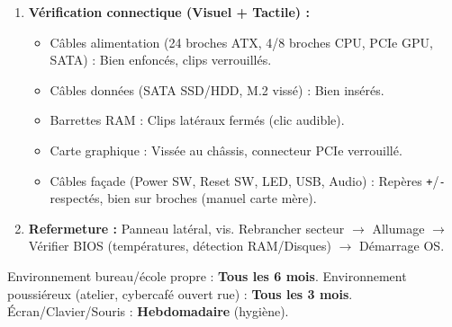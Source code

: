 \documentclass[11pt]{article}
\begin{document}
\begin{methode}
\begin{enumerate}
\begin{enumerate}
              \end{enumerate}
        \item \textbf{Vérification connectique (Visuel + Tactile) :}
              \begin{itemize}
                  \item Câbles alimentation (24 broches ATX, 4/8 broches CPU, PCIe GPU, SATA) : Bien enfoncés, clips verrouillés.
                  \item Câbles données (SATA SSD/HDD, M.2 vissé) : Bien insérés.
                  \item Barrettes RAM : Clips latéraux fermés (clic audible).
                  \item Carte graphique : Vissée au châssis, connecteur PCIe verrouillé.
                  \item Câbles façade (Power SW, Reset SW, LED, USB, Audio) : Repères \texttt{+}/\texttt{-} respectés, bien sur broches (manuel carte mère).
              \end{itemize}
        \item \textbf{Refermeture :} Panneau latéral, vis. Rebrancher secteur $\rightarrow$ Allumage $\rightarrow$ Vérifier BIOS (températures, détection RAM/Disques) $\rightarrow$ Démarrage OS.
    \end{enumerate}
\end{methode}

\begin{aretenir}
    Environnement bureau/école propre : \textbf{Tous les 6 mois}. Environnement poussiéreux (atelier, cybercafé ouvert rue) : \textbf{Tous les 3 mois}. Écran/Clavier/Souris : \textbf{Hebdomadaire} (hygiène).
\end{aretenir}
\end{document}
